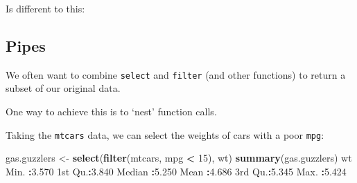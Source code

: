 \documentclass[]{article}
\newenvironment{Shaded}{\begin{snugshade}}{\end{snugshade}}
\newcommand{\DecValTok}[1]{\textcolor[rgb]{0.00,0.00,0.81}{#1}}
\newcommand{\FloatTok}[1]{\textcolor[rgb]{0.00,0.00,0.81}{#1}}
\newcommand{\KeywordTok}[1]{\textcolor[rgb]{0.13,0.29,0.53}{\textbf{#1}}}
\newcommand{\NormalTok}[1]{#1}
\newcommand{\OperatorTok}[1]{\textcolor[rgb]{0.81,0.36,0.00}{\textbf{#1}}}
\newcommand{\StringTok}[1]{\textcolor[rgb]{0.31,0.60,0.02}{#1}}
\begin{document}
\begin{Shaded}
\end{Shaded}

Is different to this:

\begin{Shaded}
\end{Shaded}

\hypertarget{pipes}{%
\subsection*{Pipes}\label{pipes}}

We often want to combine \texttt{select} and \texttt{filter} (and other functions) to return a
subset of our original data.

One way to achieve this is to `nest' function calls.

Taking the \texttt{mtcars} data, we can select the weights of cars with a poor \texttt{mpg}:

\begin{Shaded}
\begin{Highlighting}[]
\NormalTok{gas.guzzlers <-}\StringTok{ }\KeywordTok{select}\NormalTok{(}\KeywordTok{filter}\NormalTok{(mtcars, mpg }\OperatorTok{<}\StringTok{ }\DecValTok{15}\NormalTok{), wt)}
\KeywordTok{summary}\NormalTok{(gas.guzzlers)}
\NormalTok{       wt       }
\NormalTok{ Min.   }\OperatorTok{:}\FloatTok{3.570}  
\NormalTok{ 1st Qu.}\OperatorTok{:}\FloatTok{3.840}  
\NormalTok{ Median }\OperatorTok{:}\FloatTok{5.250}  
\NormalTok{ Mean   }\OperatorTok{:}\FloatTok{4.686}  
\NormalTok{ 3rd Qu.}\OperatorTok{:}\FloatTok{5.345}  
\NormalTok{ Max.   }\OperatorTok{:}\FloatTok{5.424}  
\end{Highlighting}
\end{Shaded}
\end{document}
